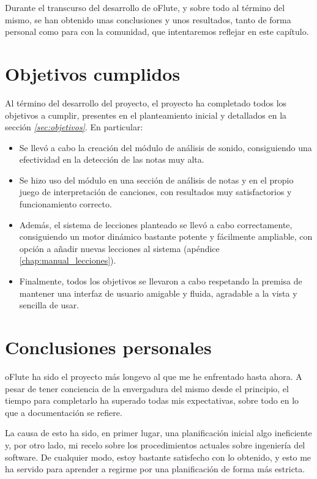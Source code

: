 Durante el transcurso del desarrollo de oFlute, y sobre todo al término del
mismo, se han obtenido unas conclusiones y unos resultados, tanto de forma
personal como para con la comunidad, que intentaremos reflejar en este capítulo.


\section{Objetivos cumplidos}
Al término del desarrollo del proyecto, el proyecto ha completado todos los
objetivos a cumplir, presentes en el planteamiento inicial y detallados en la
sección \textit{\ref{sec:objetivos}}. En particular:

\begin{itemize}
\item Se llevó a cabo la creación del módulo de análisis de sonido, consiguiendo
  una efectividad en la detección de las notas muy alta.
\item Se hizo uso del módulo en una sección de análisis de notas y en el propio
  juego de interpretación de canciones, con resultados muy satisfactorios y
  funcionamiento correcto.
\item Además, el sistema de lecciones planteado se llevó a cabo correctamente,
  consiguiendo un motor dinámico bastante potente y fácilmente ampliable, con
  opción a añadir nuevas lecciones al sistema (apéndice
  \ref{chap:manual_lecciones}).
\item Finalmente, todos los objetivos se llevaron a cabo respetando la premisa
  de mantener una interfaz de usuario amigable y fluida, agradable a la vista y
  sencilla de usar.
\end{itemize}

\section{Conclusiones personales}

oFlute ha sido el proyecto más longevo al que me he enfrentado hasta ahora. A
pesar de tener conciencia de la envergadura del mismo desde el principio, el
tiempo para completarlo ha superado todas mis expectativas, sobre todo en lo que
a documentación se refiere. 

La causa de esto ha sido, en primer lugar, una planificación inicial algo
ineficiente y, por otro lado, mi recelo sobre los procedimientos actuales sobre
ingeniería del software. De cualquier modo, estoy bastante satisfecho con lo
obtenido, y esto me ha servido para aprender a regirme por una planificación de
forma más estricta.

